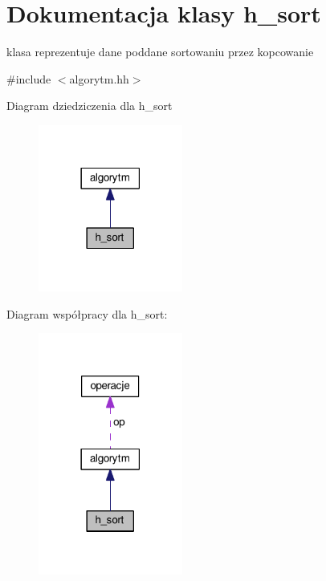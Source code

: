 \hypertarget{classh__sort}{\section{Dokumentacja klasy h\-\_\-sort}
\label{classh__sort}
}


klasa reprezentuje dane poddane sortowaniu przez kopcowanie  




{\ttfamily \#include $<$algorytm.\-hh$>$}



Diagram dziedziczenia dla h\-\_\-sort\nopagebreak
\begin{figure}[H]
\begin{center}
\leavevmode
\includegraphics[width=134pt]{classh__sort__inherit__graph}
\end{center}
\end{figure}


Diagram współpracy dla h\-\_\-sort\-:\nopagebreak
\begin{figure}[H]
\begin{center}
\leavevmode
\includegraphics[width=134pt]{classh__sort__coll__graph}
\end{center}
\end{figure}
